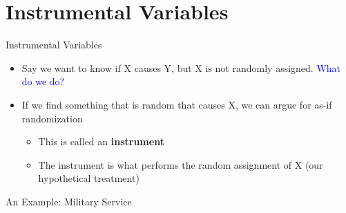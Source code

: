 \documentclass[
  11pt,
  ignorenonframetext,
]{beamer}
\providecommand{\tightlist}{%
  \setlength{\itemsep}{0pt}\setlength{\parskip}{0pt}}
\begin{document}
\section{Instrumental Variables}\label{instrumental-variables}

\begin{frame}{Instrumental Variables}
\protect{}\label{instrumental-variables-1}
\begin{itemize}
\tightlist
\item
  Say we want to know if X causes Y, but X is not randomly assigned.
  \textcolor{blue}{What do we do?} \pause
\item
  If we find something that is random that causes X, we can argue for
  as-if randomization \pause

  \begin{itemize}
  \tightlist
  \item
    This is called an \textbf{instrument} \pause
  \item
    The instrument is what performs the random assignment of X (our
    hypothetical treatment)
  \end{itemize}
\end{itemize}
\end{frame}

\begin{frame}{An Example: Military Service}
\protect{}\label{an-example-military-service}
\begin{center}
\end{center}
\end{frame}
\end{document}
